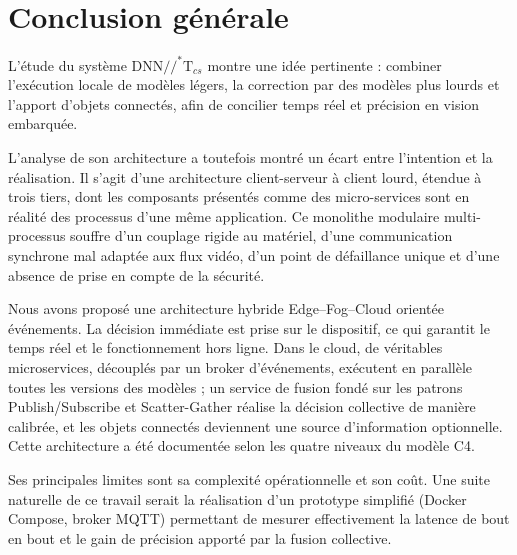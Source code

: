\documentclass[11pt,a4paper]{report}
\newcommand{\dnnTcs}{\ensuremath{\mathrm{DNN}/\!/^{*}\mathrm{T}_{cs}}}
\begin{document}
\chapter*{Conclusion générale}

L'étude du système \dnnTcs{} montre une idée pertinente : combiner l'exécution locale de modèles légers, la correction par des modèles plus lourds et l'apport d'objets connectés, afin de concilier temps réel et précision en vision embarquée.

L'analyse de son architecture a toutefois montré un écart entre l'intention et la réalisation. Il s'agit d'une architecture client-serveur à client lourd, étendue à trois tiers, dont les composants présentés comme des micro-services sont en réalité des processus d'une même application. Ce monolithe modulaire multi-processus souffre d'un couplage rigide au matériel, d'une communication synchrone mal adaptée aux flux vidéo, d'un point de défaillance unique et d'une absence de prise en compte de la sécurité.

Nous avons proposé une architecture hybride Edge--Fog--Cloud orientée événements. La décision immédiate est prise sur le dispositif, ce qui garantit le temps réel et le fonctionnement hors ligne. Dans le cloud, de véritables microservices, découplés par un broker d'événements, exécutent en parallèle toutes les versions des modèles ; un service de fusion fondé sur les patrons Publish/Subscribe et Scatter-Gather réalise la décision collective de manière calibrée, et les objets connectés deviennent une source d'information optionnelle. Cette architecture a été documentée selon les quatre niveaux du modèle C4.

Ses principales limites sont sa complexité opérationnelle et son coût. Une suite naturelle de ce travail serait la réalisation d'un prototype simplifié (Docker Compose, broker MQTT) permettant de mesurer effectivement la latence de bout en bout et le gain de précision apporté par la fusion collective.
\end{document}
